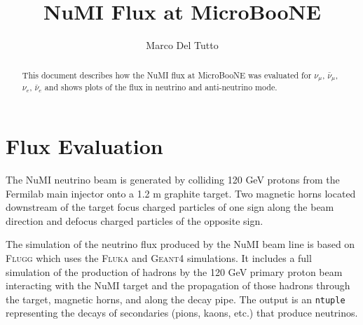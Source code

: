 \documentclass[a4paper, oneside, 12pt]{article}
\begin{document}
\author{Marco Del Tutto}
\title{NuMI Flux at MicroBooNE}



\maketitle

\begin{abstract}
This document describes how the NuMI flux at MicroBooNE was evaluated for $\nu_\mu$, $\bar{\nu}_\mu$, $\nu_e$, $\bar{\nu}_e$ and shows plots of the flux in neutrino and anti-neutrino mode.
\end{abstract}




\section{Flux Evaluation}

The NuMI neutrino beam is generated by colliding 120 GeV protons from the Fermilab main injector onto a 1.2 m graphite target. Two magnetic horns located downstream of the target focus charged particles of one sign along the beam direction and defocus charged particles of the opposite sign.

The simulation of the neutrino flux produced by the NuMI beam line is based on \textsc{Flugg} \cite{flugg} which uses the \textsc{Fluka} \cite{fluka} and \textsc{Geant4} \cite{geant} simulations. It includes a full simulation of the production of hadrons by the 120 GeV primary proton beam interacting with the NuMI target and the propagation of those hadrons through the target, magnetic horns, and along the decay pipe. The output is an \texttt{ntuple} representing the decays of secondaries (pions, kaons, etc.) that produce neutrinos.

\begin{comment}
The simulation software used is a combination of \textsc{Fluka} \cite{fluka} and \textsc{Geant4} \cite{geant}. The simulation of the physical processes is made by \textsc{Fluka} but the geometry description is written using \textsc{Geant4}. This combination is made by \textsc{Flugg} \cite{flugg}, a tool that add on to \textsc{Fluka} to interface to \textsc{Geant4} geometry. A simple model of incoming proton beam is used as a source of initial particles. The primary output of this code is an \texttt{ntuple} representing the decays of secondaries (pions, kaons, etc.) that give rise to neutrinos.
\end{comment}
\end{document}
